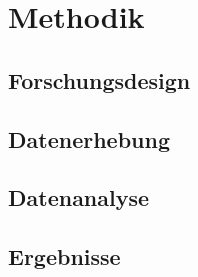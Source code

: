 
\chapter{Methodik}

\section{Forschungsdesign}

\section{Datenerhebung}

\section{Datenanalyse}

\section{Ergebnisse}







